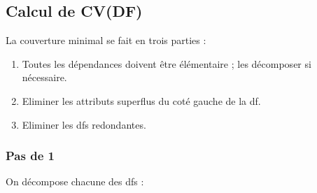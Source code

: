\documentclass[a4paper,sffamily,12pt]{article}
\begin{document}
		\subsection{Calcul de CV(DF)}

			\vspace{0.5cm}

			\noindent La couverture minimal se fait en trois parties :

			\begin{enumerate}[label=\ding{228}]
				\item Toutes les dépendances doivent être élémentaire ; les décomposer si nécessaire.
				\item Eliminer les attributs superflus du coté gauche de la df.
				\item Eliminer les dfs redondantes.
			\end{enumerate}	
			
			\vspace{0.5cm}
				
			\subsubsection{Pas de 1}

				\vspace{0.5cm}

				\noindent On décompose chacune des dfs : \\
\end{document}

